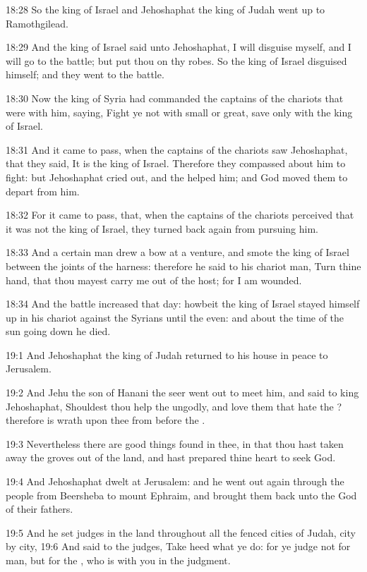 18:28 So the king of Israel and Jehoshaphat the king of Judah went up
to Ramothgilead.

18:29 And the king of Israel said unto Jehoshaphat, I will disguise
myself, and I will go to the battle; but put thou on thy robes. So the
king of Israel disguised himself; and they went to the battle.

18:30 Now the king of Syria had commanded the captains of the chariots
that were with him, saying, Fight ye not with small or great, save
only with the king of Israel.

18:31 And it came to pass, when the captains of the chariots saw
Jehoshaphat, that they said, It is the king of Israel. Therefore they
compassed about him to fight: but Jehoshaphat cried out, and the \LORD
helped him; and God moved them to depart from him.

18:32 For it came to pass, that, when the captains of the chariots
perceived that it was not the king of Israel, they turned back again
from pursuing him.

18:33 And a certain man drew a bow at a venture, and smote the king of
Israel between the joints of the harness: therefore he said to his
chariot man, Turn thine hand, that thou mayest carry me out of the
host; for I am wounded.

18:34 And the battle increased that day: howbeit the king of Israel
stayed himself up in his chariot against the Syrians until the even:
and about the time of the sun going down he died.

19:1 And Jehoshaphat the king of Judah returned to his house in peace
to Jerusalem.

19:2 And Jehu the son of Hanani the seer went out to meet him, and
said to king Jehoshaphat, Shouldest thou help the ungodly, and love
them that hate the \LORD? therefore is wrath upon thee from before the
\LORD.

19:3 Nevertheless there are good things found in thee, in that thou
hast taken away the groves out of the land, and hast prepared thine
heart to seek God.

19:4 And Jehoshaphat dwelt at Jerusalem: and he went out again through
the people from Beersheba to mount Ephraim, and brought them back unto
the \LORD God of their fathers.

19:5 And he set judges in the land throughout all the fenced cities of
Judah, city by city, 19:6 And said to the judges, Take heed what ye
do: for ye judge not for man, but for the \LORD, who is with you in the
judgment.

